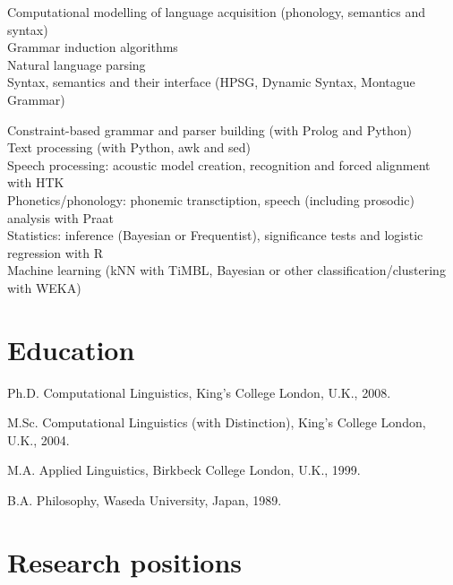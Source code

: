 \documentclass[a4paper]{article}
\renewenvironment{itemize}{
  \begin{list}{}{
    \setlength{\leftmargin}{1.5em}
  }
}{
  \end{list}
}
\begin{document}
\begin{itemize}
\item Computational modelling of language acquisition
  (phonology, semantics and syntax)\\ Grammar induction algorithms\\ Natural
  language parsing\\ Syntax, semantics and their interface (HPSG,
  Dynamic Syntax, Montague Grammar)

  Constraint-based grammar and parser building (with Prolog and Python)\\
  Text processing (with Python, awk and sed)\\
  Speech processing: acoustic model creation, recognition and forced alignment with HTK\\
  Phonetics/phonology: phonemic transctiption, speech (including  prosodic) analysis with Praat\\
  Statistics: inference (Bayesian or Frequentist), significance tests and logistic regression with R\\
  Machine learning (kNN with TiMBL, Bayesian or other classification/clustering with WEKA)\\


\end{itemize}

\vspace{-.6cm}

\section*{Education}

\begin{itemize}
  \item Ph.D. Computational Linguistics, King's College London, U.K., 2008.

  \item M.Sc. Computational Linguistics (with Distinction), King's College London, U.K., 2004.

  \item M.A. Applied Linguistics, Birkbeck College London, U.K., 1999.

  \item B.A. Philosophy, Waseda University, Japan, 1989.
\end{itemize}


\section*{Research positions}
\end{document}
